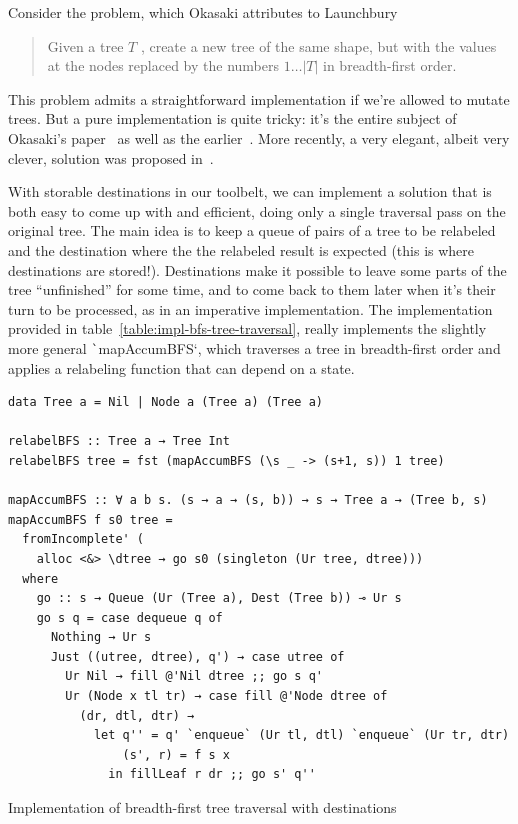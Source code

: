 \documentclass[english]{jflart}
\begin{document}
Consider the problem, which Okasaki attributes to Launchbury~\cite{okasaki_bfs_2000}
\begin{quote}
  Given a tree $T$ , create a new tree of the same
  shape, but with the values at the nodes replaced
  by the numbers $1\ldots|T|$ in breadth-first order.
\end{quote}

This problem admits a straightforward implementation if we're allowed to mutate trees. But a pure implementation is quite tricky: it's the entire subject of Okasaki's paper~\cite{okasaki_bfs_2000} as well as the earlier~\cite{jones_gibbons_linearbfs_93}. More recently, a very elegant, albeit very clever, solution was proposed in~\cite{gibbons_phases_2023}.

With storable destinations in our toolbelt, we can implement a solution that is both easy to come up with and efficient, doing only a single traversal pass on the original tree. The main idea is to keep a queue of pairs of a tree to be relabeled and the destination where the the relabeled result is expected (this is where destinations are stored!). Destinations make it possible to leave some parts of the tree ``unfinished'' for some time, and to come back to them later when it's their turn to be processed, as in an imperative implementation. The implementation provided in table~\ref{table:impl-bfs-tree-traversal}, really implements the slightly more general \texttt`mapAccumBFS`, which traverses a tree in breadth-first order and applies a relabeling function that can depend on a state.

\begin{table}[t]
\small
\begin{verbatim}
data Tree a = Nil | Node a (Tree a) (Tree a)

relabelBFS :: Tree a → Tree Int
relabelBFS tree = fst (mapAccumBFS (\s _ -> (s+1, s)) 1 tree)

mapAccumBFS :: ∀ a b s. (s → a → (s, b)) → s → Tree a → (Tree b, s)
mapAccumBFS f s0 tree =
  fromIncomplete' (
    alloc <&> \dtree → go s0 (singleton (Ur tree, dtree)))
  where
    go :: s → Queue (Ur (Tree a), Dest (Tree b)) ⊸ Ur s
    go s q = case dequeue q of
      Nothing → Ur s
      Just ((utree, dtree), q') → case utree of
        Ur Nil → fill @'Nil dtree ;; go s q'
        Ur (Node x tl tr) → case fill @'Node dtree of
          (dr, dtl, dtr) →
            let q'' = q' `enqueue` (Ur tl, dtl) `enqueue` (Ur tr, dtr)
                (s', r) = f s x
              in fillLeaf r dr ;; go s' q''
\end{verbatim}
\caption{Implementation of breadth-first tree traversal with destinations}
\label{table:impl-bfs-tree-traversal}
\end{table}
\end{document}

